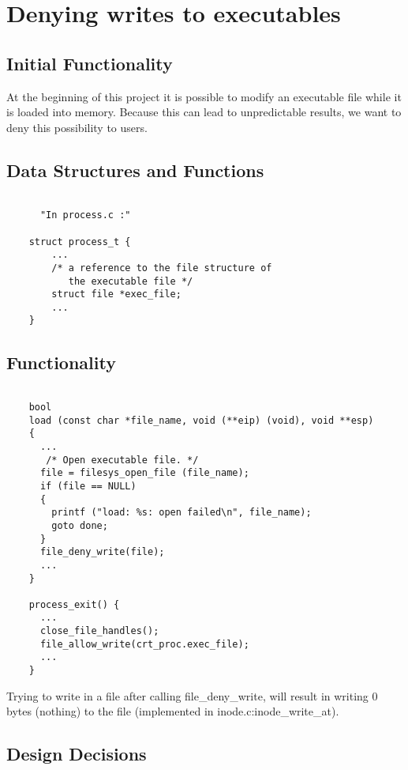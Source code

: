 \section{Denying writes to executables}

     \subsection{Initial Functionality}

	At the beginning of this project it is possible to modify an executable file while it is loaded into memory. Because this can lead to unpredictable results, we want to deny this possibility to users.

    \subsection{Data Structures and Functions}

    \begin{lstlisting}

      "In process.c :"
	
	struct process_t {
	    ...
	    /* a reference to the file structure of 
	       the executable file */
	    struct file *exec_file;
	    ...
	}

    \end{lstlisting}


    \subsection{Functionality}
   \begin{lstlisting}

	bool
	load (const char *file_name, void (**eip) (void), void **esp) 
	{
	  ...
	   /* Open executable file. */
	  file = filesys_open_file (file_name);
	  if (file == NULL) 
	  {
	    printf ("load: %s: open failed\n", file_name);
	    goto done; 
	  }
	  file_deny_write(file);
	  ...
	}

	process_exit() {
	  ...
	  close_file_handles();
	  file_allow_write(crt_proc.exec_file);
	  ...
	}	
    \end{lstlisting}

    Trying to write in a file after calling file\_deny\_write, will result in writing 0 bytes (nothing) to the file (implemented in inode.c:inode\_write\_at).

    \subsection{Design Decisions}

